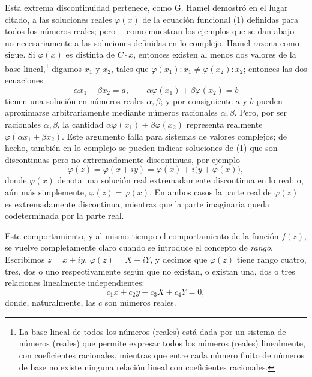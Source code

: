Esta extrema discontinuidad pertenece, como G. Hamel demostró en el lugar citado, a las soluciones reales $\varphi(x)$ de la ecuación funcional (1) definidas para todos los números reales; pero ---como muestran los ejemplos que se dan abajo--- no necesariamente a las soluciones definidas en lo complejo. Hamel razona como sigue. Si $\varphi(x)$ es distinta de $C\cdot x$, entonces existen al menos dos valores de la base lineal,\footnote{La base lineal de todos los números (reales) está dada por un sistema de números (reales) que permite expresar todos los números (reales) linealmente, con coeficientes racionales, mientras que entre cada número finito de números de base no existe ninguna relación lineal con coeficientes racionales.} digamos $x_1$ y $x_2$, tales que $\varphi(x_1):x_1\ne\varphi(x_2):x_2$; entonces las dos ecuaciones
\[
\alpha x_1+\beta x_2=a,
\qquad
\alpha\varphi(x_1)+\beta\varphi(x_2)=b
\]
tienen una solución en números reales $\alpha,\beta$; y por consiguiente $a$ y $b$ pueden aproximarse arbitrariamente mediante números racionales $\alpha,\beta$. Pero, por ser racionales $\alpha,\beta$, la cantidad $\alpha\varphi(x_1)+\beta\varphi(x_2)$ representa realmente $\varphi(\alpha x_1+\beta x_2)$. Este argumento falla para sistemas de valores complejos; de hecho, también en lo complejo se pueden indicar soluciones de (1) que son discontinuas pero no extremadamente discontinuas, por ejemplo
\[
\varphi(z)=\varphi(x+iy)=\varphi(x)+i\bigl(y+\varphi(x)\bigr),
\]
donde $\varphi(x)$ denota una solución real extremadamente discontinua en lo real; o, aún más simplemente, $\varphi(z)=\varphi(x)$. En ambos casos la parte real de $\varphi(z)$ es extremadamente discontinua, mientras que la parte imaginaria queda codeterminada por la parte real.

Este comportamiento, y al mismo tiempo el comportamiento de la función $f(z)$, se vuelve completamente claro cuando se introduce el concepto de \emph{rango}. Escribimos $z=x+iy$, $\varphi(z)=X+iY$, y decimos que $\varphi(z)$ tiene rango cuatro, tres, dos o uno respectivamente según que no existan, o existan una, dos o tres relaciones linealmente independientes:
\[
c_1x+c_2y+c_3X+c_4Y=0,
\]
donde, naturalmente, las $c$ son números reales.

